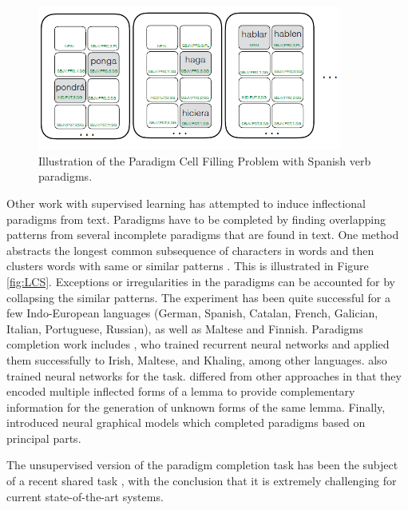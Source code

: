 \begin{figure}[tb]
\begin{center}
\includegraphics[width=10cm]{figs/PCFP.PNG}
\caption[Paradigm Cell Filling Problem]{Illustration of the Paradigm Cell Filling Problem \citep{silfverberg_encoder-decoder_2018} with Spanish verb paradigms.}
\label{fig:PCFP}
\end{center}
\end{figure}


Other work with supervised learning has attempted to induce inflectional paradigms from text. Paradigms have to be completed by finding overlapping patterns from several incomplete paradigms that are found in text. One method abstracts the longest common subsequence of characters in words and then clusters words with same or similar patterns  \citep{ahlberg_semi-supervised_2014,ahlberg_paradigm_2015}. This is illustrated in Figure \ref{fig:LCS}. Exceptions or irregularities in the paradigms can be accounted for by collapsing the similar patterns. The experiment has been quite successful for a few Indo-European languages (German, Spanish, Catalan, French, Galician, Italian, Portuguese, Russian), as well as Maltese and Finnish. Paradigms completion work includes
\citet{malouf_generating_2016}, who trained recurrent neural networks and applied them successfully to Irish, Maltese, and Khaling, among other languages.
\citet{silfverberg_encoder-decoder_2018} also trained neural networks for the task.  \citet{kann-etal-2017-neural} differed from other approaches in that they encoded multiple inflected forms of a lemma to provide complementary information for the generation of unknown forms of the same lemma.
Finally, \citet{cotterell-etal-2017-neural} introduced neural graphical models which completed paradigms based on principal parts.

The unsupervised version of the paradigm completion task \citep{jin2020unsupervised} has been the subject of a recent shared task \citep{kann2020sigmorphon}, with the conclusion that it is extremely challenging for current state-of-the-art systems. 

